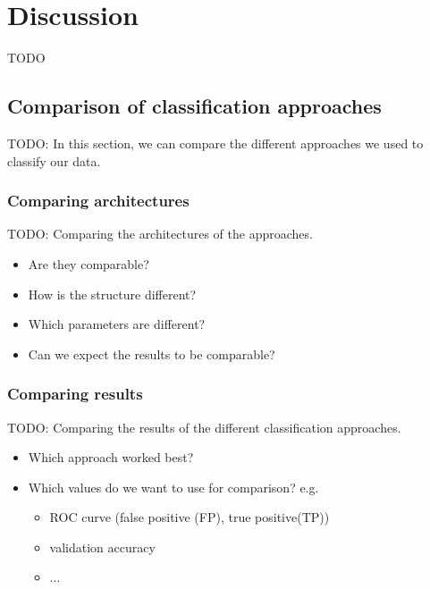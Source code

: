 \section{Discussion}

TODO

\subsection{Comparison of classification approaches}

TODO: In this section, we can compare the different approaches we used to classify our data.


\subsubsection{Comparing architectures}

TODO: Comparing the architectures of the approaches.

\begin{itemize}
\item Are they comparable?
\item How is the structure different?
\item Which parameters are different?
\item Can we expect the results to be comparable?
\end{itemize}


\subsubsection{Comparing results}

TODO: Comparing the results of the different classification approaches.

\begin{itemize}
\item Which approach worked best?
\item Which values do we want to use for comparison? e.g.

\begin{itemize}
\item ROC curve (false positive (FP), true positive(TP)) 
\item validation accuracy
\item ...
\end{itemize}

\end{itemize}



